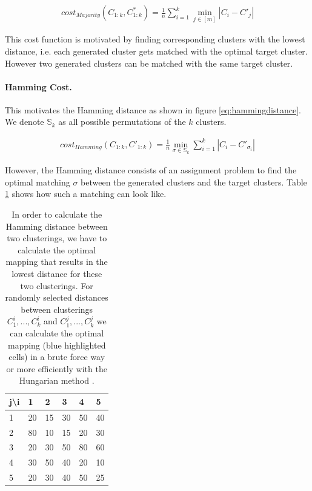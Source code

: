 \begin{equation}
    \begin{aligned}
        cost_{Majority}(C_{1:k}, C_{1:k}^*) = \frac{1}{n} \sum_{i=1}^k \min_{j \in [m]} |C_i - C'_j|
    \end{aligned}
    \label{eq:majoritydistance}
\end{equation}

This cost function is motivated by finding corresponding clusters with the lowest distance, i.e. each generated cluster gets matched with the optimal target cluster. However two generated clusters can be matched with the same target cluster. 

\paragraph{Hamming Cost.} This motivates the Hamming distance as shown in figure \ref{eq:hammingdistance}. We denote $\mathbb{S}_k$ as all possible permutations of the $k$ clusters.

\begin{equation}
    \begin{aligned}
        cost_{Hamming}(C_{1:k}, C'_{1:k}) = \frac{1}{n} \min_{\sigma \in \mathbb{S}_k} \sum_{i=1}^k |C_i - C'_{\sigma_i}|
    \end{aligned}
    \label{eq:hammingdistance}
\end{equation}

However, the Hamming distance consists of an assignment problem to find the optimal matching $\sigma$ between the generated clusters and the target clusters. Table \ref{table:matching} shows how such a matching can look like.

\begin{table}[h]
    \centering
    \begin{tabular}{|l | l l l l l|}
    \hline
    j\textbackslash i & 1 & 2 & 3 & 4 & 5\\ \hline
    1 & 20 & \cellcolor{blue!25}15 & 30 & 50 & 40\\
    2 & 80 & 10 & \cellcolor{blue!25}15 & 20 & 30\\
    3 & \cellcolor{blue!25}20 & 30 & 50 & 80 & 60\\
    4 & 30 & 50 & 40 & \cellcolor{blue!25}20 & 10\\
    5 & 20 & 30 & 40 & 50 & \cellcolor{blue!25}25\\ \hline
    \end{tabular}
    \caption{In order to calculate the Hamming distance between two clusterings, we have to calculate the optimal mapping that results in the lowest distance for these two clusterings. For randomly selected distances between clusterings $C_1^i, ..., C_k^i$ and $C_1^j, ..., C_k^j$ we can calculate the optimal mapping (blue highlighted cells) in a brute force way or more efficiently with the Hungarian method \cite{kuhn1955hungarian}\cite{munkres1957algorithms}.}
    \label{table:matching}
\end{table}

